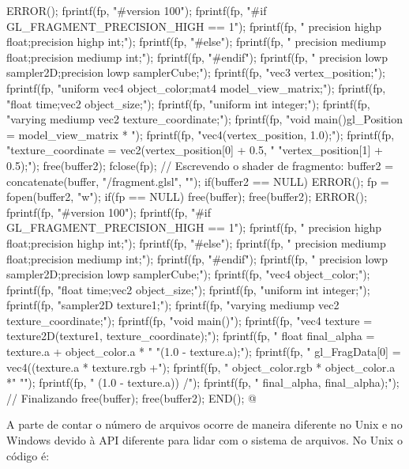 {{{        ERROR();
    }
    fprintf(fp, "#version 100\n\n");
    fprintf(fp, "#if GL_FRAGMENT_PRECISION_HIGH == 1\n");
    fprintf(fp, "  precision highp float;\n  precision highp int;\n");
    fprintf(fp, "#else\n");
    fprintf(fp, "  precision mediump float;\n  precision mediump int;\n");
    fprintf(fp, "#endif\n");
    fprintf(fp, "  precision lowp sampler2D;\n  precision lowp samplerCube;\n");
    fprintf(fp, "\n\nattribute vec3 vertex_position;\n\n");
    fprintf(fp, "uniform vec4 object_color;\nuniform mat4 model_view_matrix;");
    fprintf(fp, "\nuniform float time;\nuniform vec2 object_size;\n");
    fprintf(fp, "uniform int integer;\n\n");
    fprintf(fp, "varying mediump vec2 texture_coordinate;\n\n");
    fprintf(fp, "void main(){\n  gl_Position = model_view_matrix * ");
    fprintf(fp, "vec4(vertex_position, 1.0);\n");
    fprintf(fp, "texture_coordinate = vec2(vertex_position[0] + 0.5, "
            "vertex_position[1] + 0.5);\n}\n");
    free(buffer2);
    fclose(fp);
    // Escrevendo o shader de fragmento:
    buffer2 = concatenate(buffer, "/fragment.glsl", "");
    if(buffer2 == NULL) ERROR();
    fp = fopen(buffer2, "w");
    if(fp == NULL){
        free(buffer);
        free(buffer2);
        ERROR();
    }
    fprintf(fp, "#version 100\n\n");
    fprintf(fp, "#if GL_FRAGMENT_PRECISION_HIGH == 1\n");
    fprintf(fp, "  precision highp float;\n  precision highp int;\n");
    fprintf(fp, "#else\n");
    fprintf(fp, "  precision mediump float;\n  precision mediump int;\n");
    fprintf(fp, "#endif\n");
    fprintf(fp, "  precision lowp sampler2D;\n  precision lowp samplerCube;\n");
    fprintf(fp, "\nuniform vec4 object_color;\n");
    fprintf(fp, "\nuniform float time;\nuniform vec2 object_size;\n");
    fprintf(fp, "uniform int integer;\n");
    fprintf(fp, "\nuniform sampler2D texture1;\n");
    fprintf(fp, "varying mediump vec2 texture_coordinate;\n\n");
    fprintf(fp, "void main(){\n  ");
    fprintf(fp, "vec4 texture = texture2D(texture1, texture_coordinate);\n");
    fprintf(fp, "  float final_alpha = texture.a + object_color.a * "
            "(1.0 - texture.a);\n");
    fprintf(fp, "  gl_FragData[0] = vec4((texture.a * texture.rgb +\n");
    fprintf(fp, "                         object_color.rgb * object_color.a *"
            "\n");
    fprintf(fp, "                         (1.0 - texture.a)) /");
    fprintf(fp, "                        final_alpha, final_alpha);\n}\n");
    // Finalizando
    free(buffer);
    free(buffer2);
    END();
}
@
\fimcodigo

A parte de contar o número de arquivos ocorre de maneira diferente no
Unix e no Windows devido à API diferente para lidar com o sistema de
arquivos. No Unix o código é:

}

